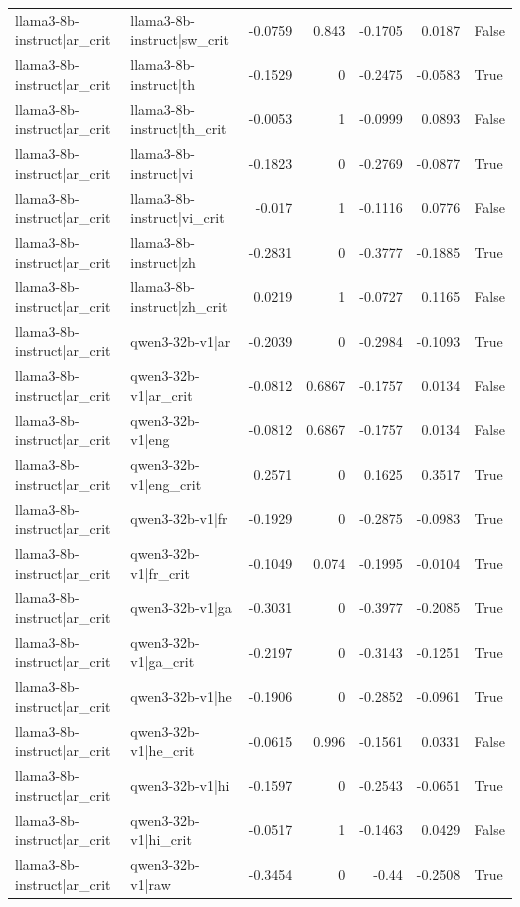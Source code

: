 \begin{table}
\begin{tabular}{l l r r r r l}
llama3-8b-instruct|ar_crit & llama3-8b-instruct|sw_crit & -0.0759 & 0.843 & -0.1705 & 0.0187 & False \\
llama3-8b-instruct|ar_crit & llama3-8b-instruct|th & -0.1529 & 0 & -0.2475 & -0.0583 & True \\
llama3-8b-instruct|ar_crit & llama3-8b-instruct|th_crit & -0.0053 & 1 & -0.0999 & 0.0893 & False \\
llama3-8b-instruct|ar_crit & llama3-8b-instruct|vi & -0.1823 & 0 & -0.2769 & -0.0877 & True \\
llama3-8b-instruct|ar_crit & llama3-8b-instruct|vi_crit & -0.017 & 1 & -0.1116 & 0.0776 & False \\
llama3-8b-instruct|ar_crit & llama3-8b-instruct|zh & -0.2831 & 0 & -0.3777 & -0.1885 & True \\
llama3-8b-instruct|ar_crit & llama3-8b-instruct|zh_crit & 0.0219 & 1 & -0.0727 & 0.1165 & False \\
llama3-8b-instruct|ar_crit & qwen3-32b-v1|ar & -0.2039 & 0 & -0.2984 & -0.1093 & True \\
llama3-8b-instruct|ar_crit & qwen3-32b-v1|ar_crit & -0.0812 & 0.6867 & -0.1757 & 0.0134 & False \\
llama3-8b-instruct|ar_crit & qwen3-32b-v1|eng & -0.0812 & 0.6867 & -0.1757 & 0.0134 & False \\
llama3-8b-instruct|ar_crit & qwen3-32b-v1|eng_crit & 0.2571 & 0 & 0.1625 & 0.3517 & True \\
llama3-8b-instruct|ar_crit & qwen3-32b-v1|fr & -0.1929 & 0 & -0.2875 & -0.0983 & True \\
llama3-8b-instruct|ar_crit & qwen3-32b-v1|fr_crit & -0.1049 & 0.074 & -0.1995 & -0.0104 & True \\
llama3-8b-instruct|ar_crit & qwen3-32b-v1|ga & -0.3031 & 0 & -0.3977 & -0.2085 & True \\
llama3-8b-instruct|ar_crit & qwen3-32b-v1|ga_crit & -0.2197 & 0 & -0.3143 & -0.1251 & True \\
llama3-8b-instruct|ar_crit & qwen3-32b-v1|he & -0.1906 & 0 & -0.2852 & -0.0961 & True \\
llama3-8b-instruct|ar_crit & qwen3-32b-v1|he_crit & -0.0615 & 0.996 & -0.1561 & 0.0331 & False \\
llama3-8b-instruct|ar_crit & qwen3-32b-v1|hi & -0.1597 & 0 & -0.2543 & -0.0651 & True \\
llama3-8b-instruct|ar_crit & qwen3-32b-v1|hi_crit & -0.0517 & 1 & -0.1463 & 0.0429 & False \\
llama3-8b-instruct|ar_crit & qwen3-32b-v1|raw & -0.3454 & 0 & -0.44 & -0.2508 & True \\

\end{tabular}
\end{table}
